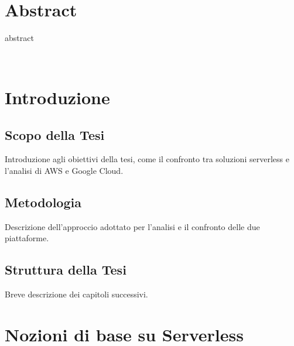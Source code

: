 \documentclass[12pt,a4paper,twoside]{book}
\begin{document}
\newpage

\newpage~\newpage
{}
\chapter*{Abstract}
abstract

\topmargin=-1cm
\tableofcontents
\thispagestyle{empty}
\listoftables
\thispagestyle{empty}
\listoffigures
\thispagestyle{empty}
\newpage~\newpage

\setcounter{chapter}{0}
\raggedbottom
\chapter{Introduzione} \label{chap:intro}
\pagestyle{plain}
\setcounter{page}{1}
\section{Scopo della Tesi}
Introduzione agli obiettivi della tesi, come il confronto tra soluzioni serverless e l'analisi di AWS e Google Cloud.

\section{Metodologia}
Descrizione dell'approccio adottato per l'analisi e il confronto delle due piattaforme.

\section{Struttura della Tesi}
Breve descrizione dei capitoli successivi.

\chapter{Nozioni di base su Serverless}
\end{document}
